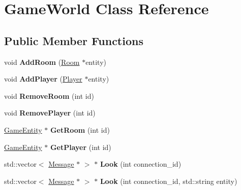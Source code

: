 \hypertarget{class_game_world}{}\section{Game\+World Class Reference}
\label{class_game_world}
\subsection*{Public Member Functions}
\begin{DoxyCompactItemize}
\item 
\hypertarget{class_game_world_abb3bfb7dea57b36a579c9ad49eca4bd1}{}void {\bfseries Add\+Room} (\hyperlink{class_room}{Room} $\ast$entity)\label{class_game_world_abb3bfb7dea57b36a579c9ad49eca4bd1}

\item 
\hypertarget{class_game_world_a79dd5e422a5cfab06c1a722ac3cbbd07}{}void {\bfseries Add\+Player} (\hyperlink{class_player}{Player} $\ast$entity)\label{class_game_world_a79dd5e422a5cfab06c1a722ac3cbbd07}

\item 
\hypertarget{class_game_world_a0870be49ea4ccd0bba56bcbb8820b289}{}void {\bfseries Remove\+Room} (int id)\label{class_game_world_a0870be49ea4ccd0bba56bcbb8820b289}

\item 
\hypertarget{class_game_world_a40afc5ab96bde45ecaa4ca795978c9c8}{}void {\bfseries Remove\+Player} (int id)\label{class_game_world_a40afc5ab96bde45ecaa4ca795978c9c8}

\item 
\hypertarget{class_game_world_ad603f152db9f0de19418f1183ff02e25}{}\hyperlink{class_game_entity}{Game\+Entity} $\ast$ {\bfseries Get\+Room} (int id)\label{class_game_world_ad603f152db9f0de19418f1183ff02e25}

\item 
\hypertarget{class_game_world_a0f59d9498e26ece0122c73e0dc563d91}{}\hyperlink{class_game_entity}{Game\+Entity} $\ast$ {\bfseries Get\+Player} (int id)\label{class_game_world_a0f59d9498e26ece0122c73e0dc563d91}

\item 
\hypertarget{class_game_world_ad6920d1ef791b83a80f4cfcfad9d6ffe}{}std\+::vector$<$ \hyperlink{class_message}{Message} $\ast$ $>$ $\ast$ {\bfseries Look} (int connection\+\_\+id)\label{class_game_world_ad6920d1ef791b83a80f4cfcfad9d6ffe}

\item 
\hypertarget{class_game_world_aa3f98d0f2cc76db913129ea2d4442e3b}{}std\+::vector$<$ \hyperlink{class_message}{Message} $\ast$ $>$ $\ast$ {\bfseries Look} (int connection\+\_\+id, std\+::string entity)\label{class_game_world_aa3f98d0f2cc76db913129ea2d4442e3b}


\end{DoxyCompactItemize}
